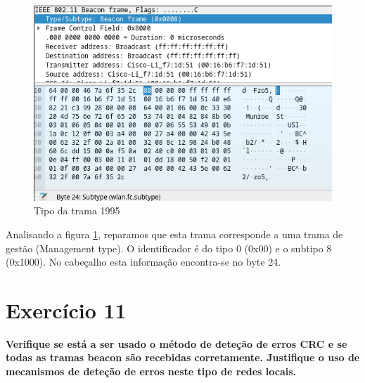\documentclass[a4paper]{report}
\begin{document}
\begin{figure}[H]
    \centering 
    \includegraphics[width=\textwidth]{images/tipoEx10.png}  
    \caption{Tipo da trama 1995}
    \label{fig:tipoEx10}
\end{figure}
Analisando a figura \ref{fig:tipoEx10}, reparamos que esta trama corresponde a
uma trama de gestão (Management type). O identificador é do tipo 0 (0x00) e o
subtipo 8 (0x1000). No cabeçalho esta informação encontra-se no byte 24.

\section{Exercício 11}
\textbf{Verifique se está a ser usado o método de deteção de erros CRC e se
todas as tramas beacon são recebidas corretamente. Justifique o uso de
mecanismos de deteção de erros neste tipo de redes locais.}
\end{document}
